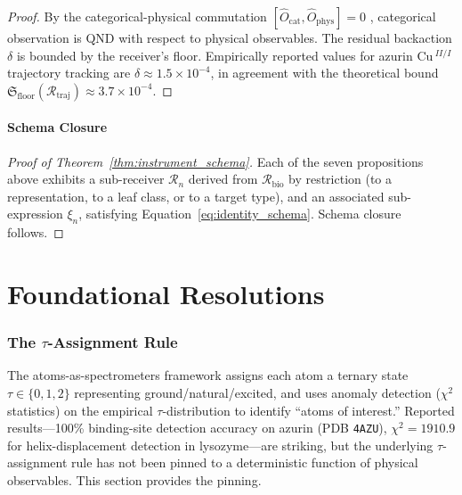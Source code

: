 \documentclass[11pt,twocolumn,a4paper]{article}
\theoremstyle{definition}
\theoremstyle{remark}
\newcommand{\Recv}{\mathcal{R}}
\newcommand{\Floor}{{\mathfrak{S}_{\mathrm{floor}}}}
\newcommand{\Sexp}{\xi}
\begin{document}
\begin{proof}
By the categorical-physical commutation $[\hat{O}_{\mathrm{cat}}, \hat{O}_{\mathrm{phys}}] = 0$ \citep{sachikonye2025_partition}, categorical observation is QND with respect to physical observables. The residual backaction $\delta$ is bounded by the receiver's floor. Empirically reported values for azurin Cu\,$^{II/I}$ trajectory tracking are $\delta \approx 1.5 \times 10^{-4}$, in agreement with the theoretical bound $\Floor(\Recv_{\mathrm{traj}}) \approx 3.7 \times 10^{-4}$.
\end{proof}

\subsection{Schema Closure}

\begin{proof}[Proof of Theorem~\ref{thm:instrument_schema}]
Each of the seven propositions above exhibits a sub-receiver $\Recv_n$ derived from $\Recv_{\mathrm{bio}}$ by restriction (to a representation, to a leaf class, or to a target type), and an associated sub-expression $\Sexp_n$, satisfying Equation~\eqref{eq:identity_schema}. Schema closure follows.
\end{proof}

\part{Foundational Resolutions}

\section{The $\tau$-Assignment Rule}
\label{sec:tau_rule}

The atoms-as-spectrometers framework \citep{sachikonye2025_atoms} assigns each atom a ternary state $\tau \in \{0, 1, 2\}$ representing ground/natural/excited, and uses anomaly detection ($\chi^2$ statistics) on the empirical $\tau$-distribution to identify ``atoms of interest.'' Reported results---100\% binding-site detection accuracy on azurin (PDB \texttt{4AZU}), $\chi^2 = 1910.9$ for helix-displacement detection in lysozyme---are striking, but the underlying $\tau$-assignment rule has not been pinned to a deterministic function of physical observables. This section provides the pinning.
\end{document}
